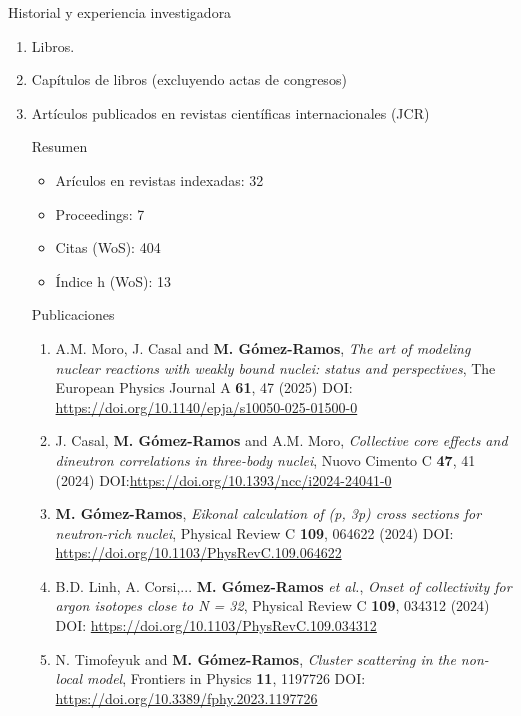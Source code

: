 \documentclass{resume2} %
\begin{document}
\begin{rSection}{Historial y experiencia investigadora}
\begin{enumerate}[label=\alph*.]
\item Libros.

\item Cap\'itulos de libros (excluyendo actas de congresos)

\item Art\'iculos publicados en revistas cient\'ificas internacionales (JCR)

{\sc Resumen}

\begin{itemize}
\item Ar\'iculos en revistas indexadas: 32

\item Proceedings: 7

\item Citas (WoS): 404

\item \'Indice h (WoS): 13
\end{itemize}

{\sc Publicaciones}

\begin{enumerate}[label=\arabic*.]
\item A.M. Moro, J. Casal and {\bf M. G\'omez-Ramos}, {\it The art of modeling nuclear reactions with weakly bound nuclei: status and perspectives}, The European Physics Journal A {\bf 61}, 47 (2025) DOI: \url{https://doi.org/10.1140/epja/s10050-025-01500-0}

\item J. Casal, {\bf M. G\'omez-Ramos} and  A.M. Moro, {\it Collective core effects and dineutron correlations in three-body nuclei}, Nuovo Cimento C {\bf 47}, 41 (2024) DOI:\url{https://doi.org/10.1393/ncc/i2024-24041-0}

\item {\bf M. G\'omez-Ramos}, {\it Eikonal calculation of (p, 3p) cross sections for neutron-rich nuclei}, Physical Review C {\bf 109}, 064622 (2024) DOI: \url{https://doi.org/10.1103/PhysRevC.109.064622}

\item B.D. Linh, A. Corsi,... {\bf M. G\'omez-Ramos} \textit{et al.}, {\it Onset of collectivity for argon isotopes close to N = 32}, Physical Review C {\bf 109}, 034312 (2024) DOI: \url{https://doi.org/10.1103/PhysRevC.109.034312}



\item N. Timofeyuk and {\bf M. G\'omez-Ramos}, {\it Cluster scattering in the non-local model}, Frontiers in Physics {\bf 11}, 1197726 DOI: \url{https://doi.org/10.3389/fphy.2023.1197726}


\end{enumerate}
\end{enumerate}
\end{rSection}
\end{document}
